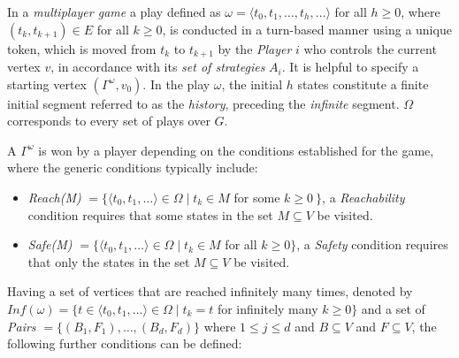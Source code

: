 \documentclass{article}
\begin{document}
In a \textit{multiplayer game} a play defined as $\omega = \langle t_0,t_1,\ldots,t_h,\ldots \rangle$ for all $h \geqslant 0$, where $(t_k,t_{k+1}) \in E$ for all $k \geqslant 0$, is conducted in a turn-based manner using a unique token, which is moved from $t_k$ to $t_{k+1}$ by the \textit{Player} $i$ who controls the current vertex $v$, in accordance with its \textit{set of strategies} $A_i$.  It is helpful to specify a starting vertex $(\Gamma^\omega,v_0)$.  In the play $\omega$, the initial $h$ states constitute a finite initial segment referred to as the \textit{history}, preceding the \textit{infinite} segment.  $\Omega$ corresponds to every set of plays over $G$. \cite{ChatterjeeKrishnendu2012Asos}

A $\Gamma^\omega$ is won by a player depending on the conditions established for the game, where the generic conditions typically include: \cite{ChatterjeeKrishnendu2012Asos,Erich2008SCaA}
\begin{itemize}
    \item \textit{Reach(M)} $= \{\langle t_0,t_1,\ldots \rangle \in \Omega \mid t_k \in M$ for some $k \geqslant 0\ \}$, a \textit{Reachability} condition requires that some states in the set $M \subseteq V$ be visited.

    \item \textit{Safe(M)} $= \{\langle t_0,t_1, \ldots \rangle \in \Omega \mid t_k \in M$ for all $k \geqslant 0\}$, a \textit{Safety} condition requires that only the states in the set $M \subseteq V$ be visited.
\end{itemize}

Having a set of vertices that are reached infinitely many times, denoted by $\textit{Inf}(\omega) = \{t \in \langle t_0,t_1,\ldots \rangle \in \Omega \mid t_k = t$ for infinitely many $k \geqslant 0\}$ and a set of \textit{Pairs} $ = \{(B_1,F_1),\ldots,(B_d,F_d)\}$ where $1 \leqslant j \leqslant d $ and $B \subseteq V$ and $F \subseteq V$, the following further conditions can be defined:
\end{document}
